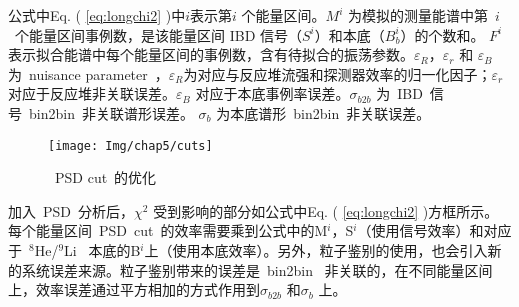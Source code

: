 公式中Eq. ( \ref{eq:longchi2} )中$i$表示第$i$ 个能量区间。$M^{i}$ 为模拟的测量能谱中第~$i$~个能量区间事例数，是该能量区间 IBD 信号（$S^i$）和本底（$B^i_b$）的个数和。 $F^i$表示拟合能谱中每个能量区间的事例数，含有待拟合的振荡参数。$\varepsilon_R$，$\varepsilon_{r}$  和 $\varepsilon_B$ 为~nuisance parameter~，$\varepsilon_R$为对应与反应堆流强和探测器效率的归一化因子；$\varepsilon_{r}$ 对应于反应堆非关联误差。$\varepsilon_B$ 对应于本底事例率误差。$\sigma_{b2b}$ 为~IBD~信号~bin2bin~非关联谱形误差。 $\sigma_{b}$ 为本底谱形~bin2bin~非关联误差。

\begin{figure}[!htbp]
  \centering
   \texttt{[image: Img/chap5/cuts]}
    \caption{~PSD cut~的优化}
  \label{fig:p518}
\end{figure}
加入~PSD~分析后，$\chi^2$ 受到影响的部分如公式中Eq. ( \ref{eq:longchi2} )方框所示。每个能量区间~PSD~cut~的效率需要乘到公式中的M$^i$，S$^i$（使用信号效率）和对应于~$^{8}$He/$^{9}$Li~ 本底的B$^i$上（使用本底效率）。另外，粒子鉴别的使用，也会引入新的系统误差来源。粒子鉴别带来的误差是~bin2bin~ 非关联的，在不同能量区间上，效率误差通过平方相加的方式作用到$\sigma_{b2b}$ 和$\sigma_b$ 上。

